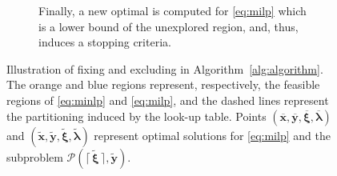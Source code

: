 \documentclass[pdflatex,sn-mathphys-num]{sn-jnl}%
\DeclareRobustCommand{\dbtilde}[1]{\accentset{\approx}{#1}}
\begin{document}
\begin{figure}[H]
\begin{subfigure}[t]{0.49\textwidth}
\begin{tikzpicture}
        \end{tikzpicture}
        \caption{Finally, a new optimal is computed for \ref{eq:milp} which is a lower bound of the unexplored region, and, thus, induces a stopping criteria.}\label{fig:alg-d}
    \end{subfigure}
    \caption{%
    Illustration of fixing and excluding in Algorithm~\ref{alg:algorithm}.
    The orange and blue regions represent, respectively, the feasible regions of \ref{eq:minlp} and \ref{eq:milp}, and the dashed lines represent the partitioning induced by the look-up table. Points $(\overline{\bm{x}},\overline{\bm{y}},\overline{\bm{\xi}},\overline{\bm{\lambda}})$ and $(\widetilde{\bm{x}},\widetilde{\bm{y}},\widetilde{\bm{\xi}},\widetilde{\bm{\lambda}})$ represent optimal solutions for \ref{eq:milp} and the subproblem $\mathcal{P}(\lceil\, \widetilde{\bm{\xi}} \,\rceil,\widetilde{\bm{y}})$.
    }
    \label{fig:alg-steps}
\end{figure}
\end{document}
